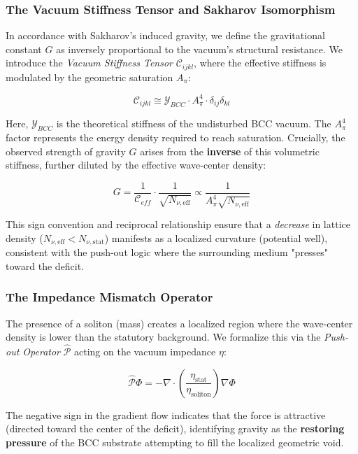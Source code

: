 \documentclass[10pt,a4paper]{article}
\begin{document}
\subsubsection{The Vacuum Stiffness Tensor and Sakharov Isomorphism}
In accordance with Sakharov's induced gravity, we define the gravitational constant $G$ as inversely proportional to the vacuum's structural resistance. We introduce the \textit{Vacuum Stiffness Tensor} $\mathcal{C}_{ijkl}$, where the effective stiffness is modulated by the geometric saturation $A_{\pi}$:

\begin{equation}
	\mathcal{C}_{ijkl} \cong \mathcal{Y}_{BCC} \cdot A_{\pi}^{4} \cdot \delta_{ij}\delta_{kl}
\end{equation}

Here, $\mathcal{Y}_{BCC}$ is the theoretical stiffness of the undisturbed BCC vacuum. The $A_{\pi}^{4}$ factor represents the energy density required to reach saturation. Crucially, the observed strength of gravity $G$ arises from the \textbf{inverse} of this volumetric stiffness, further diluted by the effective wave-center density:

\begin{equation}
	G = \frac{1}{\mathcal{C}_{eff}} \cdot \frac{1}{\sqrt{N_{\nu, \text{eff}}}} \propto \frac{1}{A_{\pi}^4 \sqrt{N_{\nu, \text{eff}}}}
\end{equation}

This sign convention and reciprocal relationship ensure that a \textit{decrease} in lattice density ($N_{\nu, \text{eff}} < N_{\nu, \text{stat}}$) manifests as a localized curvature (potential well), consistent with the push-out logic where the surrounding medium "presses" toward the deficit.

\subsubsection{The Impedance Mismatch Operator}
The presence of a soliton (mass) creates a localized region where the wave-center density is lower than the statutory background. We formalize this via the \textit{Push-out Operator} $\hat{\mathcal{P}}$ acting on the vacuum impedance $\eta$:

\begin{equation}
	\hat{\mathcal{P}} \Phi = - \nabla \cdot \left( \frac{\eta_{\text{stat}}}{\eta_{\text{soliton}}} \right) \nabla \Phi
\end{equation}

The negative sign in the gradient flow indicates that the force is attractive (directed toward the center of the deficit), identifying gravity as the \textbf{restoring pressure} of the BCC substrate attempting to fill the localized geometric void.
\end{document}
